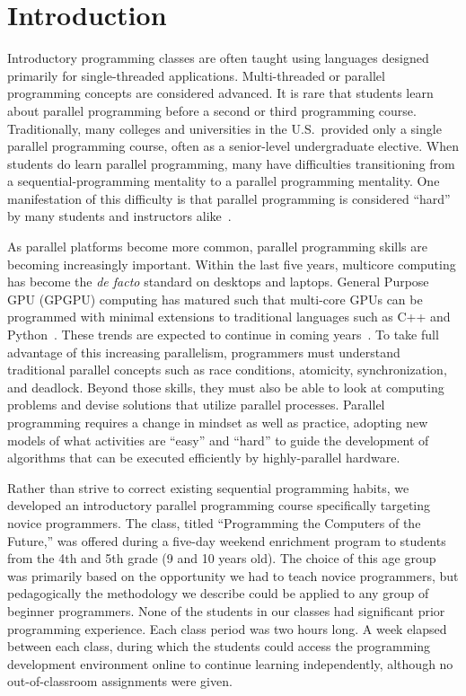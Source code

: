 \documentclass{sig-alternate}
\begin{document}
\section{Introduction}
Introductory programming classes are often taught using languages designed primarily for single-threaded applications.  
Multi-threaded or parallel programming concepts are considered advanced. 
It is rare that students learn about parallel programming before a second or third programming course.  
Traditionally, many colleges and universities in the U.S.\ provided only a single parallel programming course, often as a senior-level undergraduate elective. 
When students do learn parallel programming, many have difficulties transitioning from a sequential-programming mentality to a parallel programming mentality.
One manifestation of this difficulty is that parallel programming is considered ``hard'' by many students and instructors alike~\cite{parallelExpectations}.

As parallel platforms become more common, parallel programming skills are becoming increasingly important.  
Within the last five years, multicore computing has become the \emph{de facto} standard on desktops and laptops.
General Purpose GPU (GPGPU) computing has matured such that multi-core GPUs can be programmed with minimal extensions to traditional languages such as C++ and Python~\cite{gpgpuLanguages}.  
These trends are expected to continue in coming years~\cite{multicoreTrends}.
To take full advantage of this increasing parallelism, programmers must understand traditional parallel concepts such as race conditions, atomicity, synchronization, and deadlock.
Beyond those skills, they must also be able to look at computing problems and devise solutions that utilize parallel processes.
Parallel programming requires a change in mindset as well as practice, adopting new models of what activities are ``easy'' and ``hard'' to guide the development of algorithms that can be executed efficiently by highly-parallel hardware.

Rather than strive to correct existing sequential programming habits,
we developed an introductory parallel programming course specifically targeting novice programmers.
The class, titled ``Programming the Computers of the Future,'' was offered during a five-day weekend
enrichment program to students from the 4th and 5th grade (9 and 10 years old).  The choice of 
this age group was primarily based on the opportunity we had to teach novice programmers, but
pedagogically the methodology we describe could be applied to any group of beginner programmers.
None of the students in our classes had significant prior programming experience.
Each class period was two hours long.
A week elapsed between each class, during which the students
could access the programming development environment online to continue learning independently,
although no out-of-classroom assignments were given.
\end{document}
